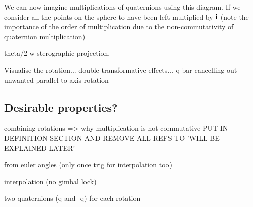 \documentclass[10pt]{article}
\begin{document}
We can now imagine multiplications of quaternions using this diagram. If we consider all the points on the sphere to have been left multiplied by $\vb{i}$ (note the importance of the order of multiplication due to the non-commutativity of quaternion multiplication)

theta/2 w sterographic projection.

Visualise the rotation... double transformative effects...
q bar cancelling out unwanted parallel to axis rotation

\subsection{Desirable properties?}

combining rotations => why multiplication is not commutative PUT IN DEFINITION SECTION AND REMOVE ALL REFS TO 'WILL BE EXPLAINED LATER'

from euler angles (only once trig for interpolation too)

interpolation (no gimbal lock)

two quaternions (q and -q) for each rotation

\pagebreak

\printbibliography
\end{document}

